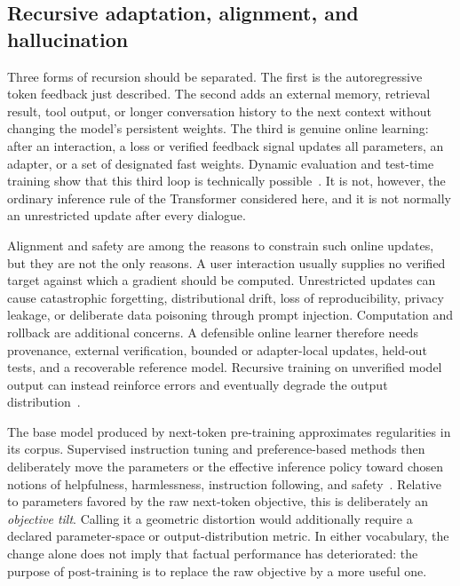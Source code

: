 \documentclass[
  aps,
  reprint,
  superscriptaddress,
  floatfix,
  nofootinbib,
  longbibliography
]{revtex4-2}
\begin{document}
\subsection{Recursive adaptation, alignment, and hallucination}
\label{sec:prose-online}

Three forms of recursion should be separated.  The first is the
autoregressive token feedback just described.  The second adds an external
memory, retrieval result, tool output, or longer conversation history to the
next context without changing the model's persistent weights.  The third is
genuine online learning: after an interaction, a loss or verified feedback
signal updates all parameters, an adapter, or a set of designated fast
weights.  Dynamic evaluation and test-time training show that this third loop
is technically possible~\cite{rannentriki2024dynamic}.  It is not, however,
the ordinary inference rule of the Transformer considered here, and it is not
normally an unrestricted update after every dialogue.

Alignment and safety are among the reasons to constrain such online updates,
but they are not the only reasons.  A user interaction usually supplies no
verified target against which a gradient should be computed.  Unrestricted
updates can cause catastrophic forgetting, distributional drift, loss of
reproducibility, privacy leakage, or deliberate data poisoning through prompt
injection.  Computation and rollback are additional concerns.  A defensible
online learner therefore needs provenance, external verification, bounded or
adapter-local updates, held-out tests, and a recoverable reference model.
Recursive training on unverified model output can instead reinforce errors and
eventually degrade the output distribution~\cite{herel2024collapse}.

The base model produced by next-token pre-training approximates regularities
in its corpus.  Supervised instruction tuning and preference-based methods
then deliberately move the parameters or the effective inference policy
toward chosen notions of helpfulness, harmlessness, instruction following,
and safety~\cite{ouyang2022instructgpt}.  Relative to parameters favored by the
raw next-token objective, this is deliberately an \emph{objective tilt}.
Calling it a geometric distortion would additionally require a declared
parameter-space or output-distribution metric.  In either vocabulary, the
change alone does not imply that factual performance has deteriorated: the
purpose of post-training is to replace the raw objective by a more useful one.
\end{document}
